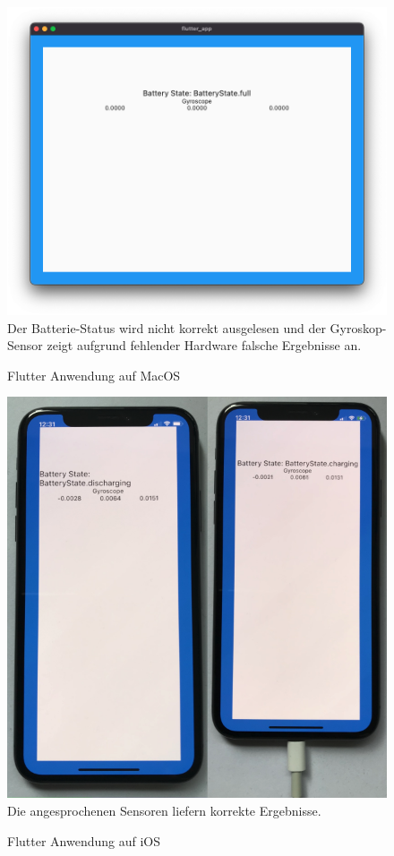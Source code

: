 \documentclass[a4paper]{scrartcl}
\begin{document}
\begin{figure}[H]
	\centering
	\caption{Flutter Anwendung auf MacOS}
	\includegraphics[scale=0.35]{_assets/Mac_Flutter_plugged.png} \\
	Der Batterie-Status wird nicht korrekt ausgelesen und der Gyroskop-Sensor zeigt aufgrund fehlender Hardware falsche Ergebnisse an.
\end{figure}


\begin{figure}[H]
	\centering
	\caption{Flutter Anwendung auf iOS}
	\includegraphics[scale=0.35]{_assets/iOS_Flutter.png} \\
	Die angesprochenen Sensoren liefern korrekte Ergebnisse.
\end{figure}
\end{document}
